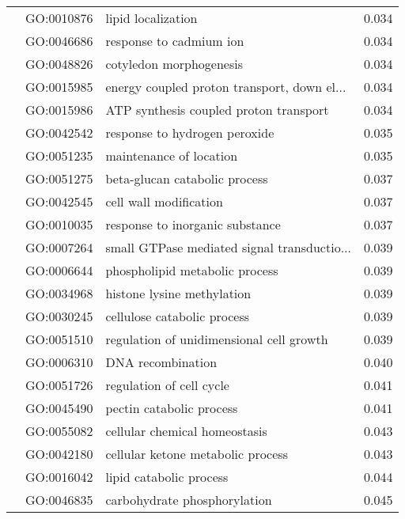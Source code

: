 \begin{longtable}{lllr}
   & GO:0010876 &                           lipid localization &         0.034 \\
   & GO:0046686 &                      response to cadmium ion &         0.034 \\
   & GO:0048826 &                      cotyledon morphogenesis &         0.034 \\
   & GO:0015985 &  energy coupled proton transport, down el... &         0.034 \\
   & GO:0015986 &       ATP synthesis coupled proton transport &         0.034 \\
   & GO:0042542 &                response to hydrogen peroxide &         0.035 \\
   & GO:0051235 &                      maintenance of location &         0.035 \\
   & GO:0051275 &                beta-glucan catabolic process &         0.037 \\
   & GO:0042545 &                       cell wall modification &         0.037 \\
   & GO:0010035 &              response to inorganic substance &         0.037 \\
   & GO:0007264 &  small GTPase mediated signal transductio... &         0.039 \\
   & GO:0006644 &               phospholipid metabolic process &         0.039 \\
   & GO:0034968 &                   histone lysine methylation &         0.039 \\
   & GO:0030245 &                  cellulose catabolic process &         0.039 \\
   & GO:0051510 &     regulation of unidimensional cell growth &         0.039 \\
   & GO:0006310 &                            DNA recombination &         0.040 \\
   & GO:0051726 &                     regulation of cell cycle &         0.041 \\
   & GO:0045490 &                     pectin catabolic process &         0.041 \\
   & GO:0055082 &                cellular chemical homeostasis &         0.043 \\
   & GO:0042180 &            cellular ketone metabolic process &         0.043 \\
   & GO:0016042 &                      lipid catabolic process &         0.044 \\
   & GO:0046835 &                 carbohydrate phosphorylation &         0.045 \\

\end{longtable}

